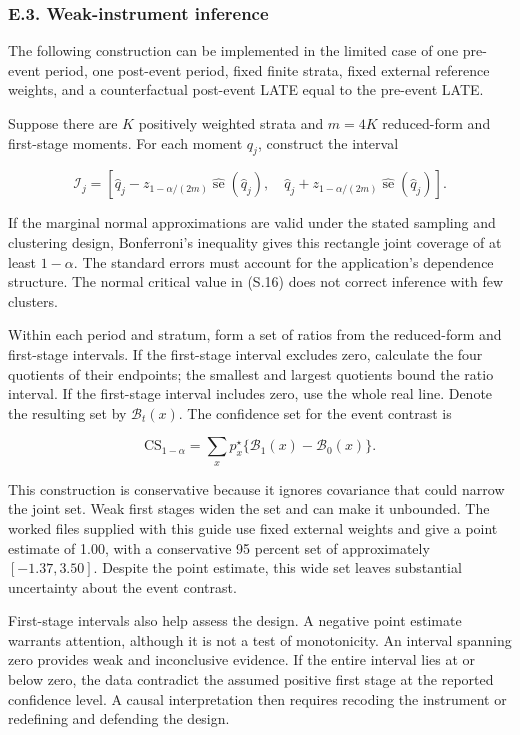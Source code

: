 \documentclass[
  11pt,
]{article}
\begin{document}
\hypertarget{e.3.-weak-instrument-inference}{%
\subsubsection{E.3. Weak-instrument
inference}\label{e.3.-weak-instrument-inference}}

The following construction can be implemented in the limited case of one
pre-event period, one post-event period, fixed finite strata, fixed
external reference weights, and a counterfactual post-event LATE equal
to the pre-event LATE.

Suppose there are \(K\) positively weighted strata and \(m=4K\)
reduced-form and first-stage moments. For each moment \(q_j\), construct
the interval

\[
\mathcal I_j=
\left[
\widehat q_j-z_{1-\alpha/(2m)}
\widehat{\operatorname{se}}(\widehat q_j),
\quad
\widehat q_j+z_{1-\alpha/(2m)}
\widehat{\operatorname{se}}(\widehat q_j)
\right].
\tag{S.16}
\]

If the marginal normal approximations are valid under the stated
sampling and clustering design, Bonferroni's inequality gives this
rectangle joint coverage of at least \(1-\alpha\). The standard errors
must account for the application's dependence structure. The normal
critical value in (S.16) does not correct inference with few clusters.

\Needspace{0.21\textheight}

Within each period and stratum, form a set of ratios from the
reduced-form and first-stage intervals. If the first-stage interval
excludes zero, calculate the four quotients of their endpoints; the
smallest and largest quotients bound the ratio interval. If the
first-stage interval includes zero, use the whole real line. Denote the
resulting set by \(\mathcal B_t(x)\). The confidence set for the event
contrast is

\[
\mathrm{CS}_{1-\alpha}
=\sum_x p_x^\star
\{\mathcal B_1(x)-\mathcal B_0(x)\}.
\tag{S.17}
\]

This construction is conservative because it ignores covariance that
could narrow the joint set. Weak first stages widen the set and can make
it unbounded. The worked files supplied with this guide use fixed
external weights and give a point estimate of 1.00, with a conservative
95 percent set of approximately \([-1.37,3.50]\). Despite the point
estimate, this wide set leaves substantial uncertainty about the event
contrast.

First-stage intervals also help assess the design. A negative point
estimate warrants attention, although it is not a test of monotonicity.
An interval spanning zero provides weak and inconclusive evidence. If
the entire interval lies at or below zero, the data contradict the
assumed positive first stage at the reported confidence level. A causal
interpretation then requires recoding the instrument or redefining and
defending the design.
\end{document}
